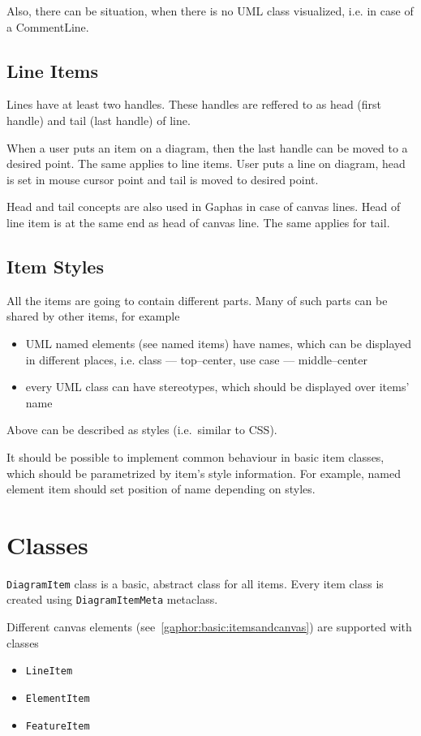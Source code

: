 \documentclass[draft]{book}
\newcommand{\rclass}[1]{\texttt{#1}}
\begin{document}
Also, there can be situation, when there is no UML class visualized, i.e.
in case of a CommentLine.

\subsection{Line Items}
Lines have at least two handles. These handles are reffered to as head (first
handle) and tail (last handle) of line.

When a user puts an item on a diagram, then the last handle can be moved to
a desired point. The same applies to line items. User puts a line on diagram,
head is set in mouse cursor point and tail is moved to desired point.

Head and tail concepts are also used in Gaphas in case of canvas lines.
Head of line item is at the same end as head of canvas line. The same
applies for tail.

\subsection{Item Styles}
All the items are going to contain different parts.
Many of such parts can be shared by other items, for example
\begin{itemize}
\item UML named elements (see named items) have names, which
    can be displayed in different places, i.e. class --- top--center,
    use case --- middle--center
\item every UML class can have stereotypes, which should be displayed
    over items' name
\end{itemize}

Above can be described as styles (i.e.\ similar to CSS).

It should be possible to implement common behaviour in basic item classes,
which should be parametrized by item's style information. For example,
named element item should set position of name depending on styles.

\section{Classes}
\rclass{DiagramItem} class is a basic, abstract class for all items. Every
item class is created using \rclass{DiagramItemMeta} metaclass.

Different canvas elements (see~\ref{gaphor:basic:itemsandcanvas}) are
supported with classes
\begin{itemize}
\itemsep0pt
\item \rclass{LineItem}
\item \rclass{ElementItem}
\item \rclass{FeatureItem}
\end{itemize}
\end{document}
